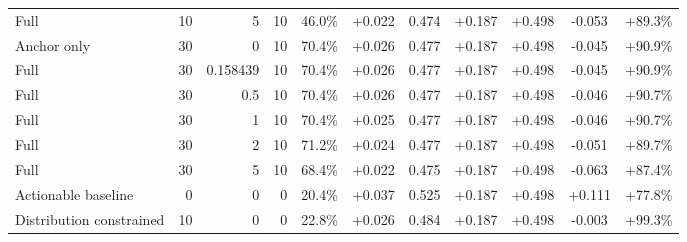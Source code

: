 \begin{table}[htbp]
\begin{tabular}{lrrrccccccc}
Full & 10 & 5 & 10 & 46.0\% & +0.022 & 0.474 & +0.187 & +0.498 & -0.053 & +89.3\% \\
Anchor only & 30 & 0 & 10 & 70.4\% & +0.026 & 0.477 & +0.187 & +0.498 & -0.045 & +90.9\% \\
Full & 30 & 0.158439 & 10 & 70.4\% & +0.026 & 0.477 & +0.187 & +0.498 & -0.045 & +90.9\% \\
Full & 30 & 0.5 & 10 & 70.4\% & +0.026 & 0.477 & +0.187 & +0.498 & -0.046 & +90.7\% \\
Full & 30 & 1 & 10 & 70.4\% & +0.025 & 0.477 & +0.187 & +0.498 & -0.046 & +90.7\% \\
Full & 30 & 2 & 10 & 71.2\% & +0.024 & 0.477 & +0.187 & +0.498 & -0.051 & +89.7\% \\
Full & 30 & 5 & 10 & 68.4\% & +0.022 & 0.475 & +0.187 & +0.498 & -0.063 & +87.4\% \\
Actionable baseline & 0 & 0 & 0 & 20.4\% & +0.037 & 0.525 & +0.187 & +0.498 & +0.111 & +77.8\% \\
Distribution constrained & 10 & 0 & 0 & 22.8\% & +0.026 & 0.484 & +0.187 & +0.498 & -0.003 & +99.3\% \\
\bottomrule
\end{tabular}
\end{table}